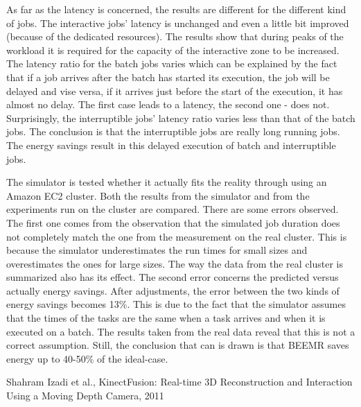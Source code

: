 \documentclass[9pt, a4paper]{article}
\theoremstyle{plain}
\begin{document}
As far as the latency is concerned, the results are different for the different
kind of jobs. The interactive jobs' latency is unchanged and even a little bit
improved (because of the dedicated resources). The results show that during peaks
of the workload it is required for the capacity of the interactive zone to be increased.
The latency ratio for the batch jobs varies which can be explained by the fact that
if a job arrives after the batch has started its execution, the job will be delayed
and vise versa, if it arrives just before the start of the execution, it has almost no delay.
The first case leads to a latency, the second one - does not. Surprisingly, the interruptible
jobs' latency ratio varies less than that of the batch jobs. The conclusion is
that the interruptible jobs are really long running jobs. The energy savings result in this delayed
execution of batch and interruptible jobs.

The simulator is tested whether it actually fits the reality through using an Amazon EC2
cluster. Both the results from the simulator and from the experiments run on the
cluster are compared. There are some errors observed. The first one comes from the
observation that the simulated job duration does not completely match the one from
the measurement on the real cluster. This is because the simulator underestimates
the run times for small sizes and overestimates the ones for large sizes. The way
the data from the real cluster is summarized also has its effect. The second error
concerns the predicted versus actually energy savings. After adjustments, the
error between the two kinds of energy savings becomes 13\%. This is due to the fact that
the simulator assumes that the times of the tasks are the same when a task arrives
and when it is executed on a batch. The results taken from the real data reveal
that this is not a correct assumption. Still, the conclusion that can is drawn is
that BEEMR saves energy up to 40-50\% of the ideal-case.

\cite{kinectfusion}

\begin{thebibliography}{widest entry}
   Shahram Izadi et al., KinectFusion: Real-time 3D
    Reconstruction and Interaction Using a Moving Depth Camera, 2011
\end{thebibliography}

\hfill\\
\end{document}
